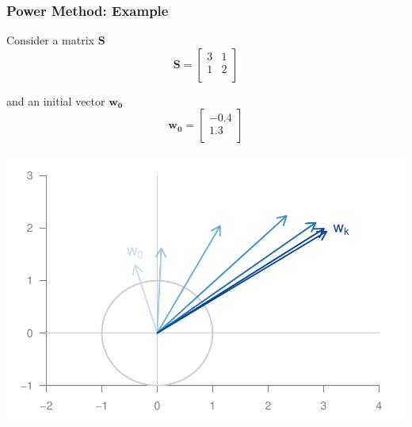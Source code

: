 \documentclass[12pt]{beamer}\usepackage[]{graphicx}\usepackage[]{color}
\makeatletter
\def\maxwidth{ %
  \ifdim\Gin@nat@width>\linewidth
    \linewidth
  \else
    \Gin@nat@width
  \fi
}
\newenvironment{knitrout}{}{} %
\makeatother
\begin{document}

\begin{frame}[fragile]
\frametitle{Power Method: Example}

Consider a matrix $\mathbf{S}$
$$
\mathbf{S} =
\begin{bmatrix}
3 & 1 \\
1 & 2 \\
\end{bmatrix}
$$

\bigskip
and an initial vector $\mathbf{w_0}$
$$
\mathbf{w_0} =
\begin{bmatrix}
-0.4 \\
1.3 \\
\end{bmatrix}
$$

\end{frame}


\begin{frame}[fragile]

\begin{knitrout}\footnotesize
{}\color{fgcolor}

{\centering \includegraphics[width=\maxwidth]{figure/power-method-example-1} 

}



\end{knitrout}

\end{frame}

\end{document}
